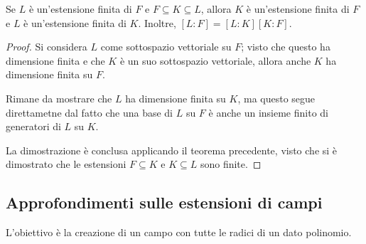 \documentclass[11pt, a4paper]{scrartcl}
\theoremstyle{definition}
\numberwithin{esempio}{section}
\theoremstyle{definition}
\numberwithin{obs}{section}
\numberwithin{nota}{section}
\numberwithin{equation}{subsection}
\begin{document}
\begin{corollario}
	{}{}
	Se $L$ \`e un'estensione finita di $F$ e $F \subseteq K \subseteq L$, allora $K$ \`e un'estensione finita di $F$ e $L$ \`e un'estensione finita di $K$.
	Inoltre, $[L:F]=[L:K][K:F]$.
	\begin{proof}
		Si considera $L$ come sottospazio vettoriale su $F$; visto che questo ha dimensione finita e che $K$ \`e un suo sottospazio vettoriale, allora anche $K$ ha dimensione finita su $F$.

		Rimane da mostrare che $L$ ha dimensione finita su $K$, ma questo segue direttametne dal fatto che una base di $L$ su $F$ \`e anche un insieme finito di generatori di $L$ su $K$.

		La dimostrazione \`e conclusa applicando il teorema precedente, visto che si \`e dimostrato che le estensioni $F\subseteq K$ e $K \subseteq L$ sono finite.
	\end{proof}
\end{corollario}
\subsection{Approfondimenti sulle estensioni di campi}
L'obiettivo \`e la creazione di un campo con tutte le radici di un dato polinomio.
\end{document}

